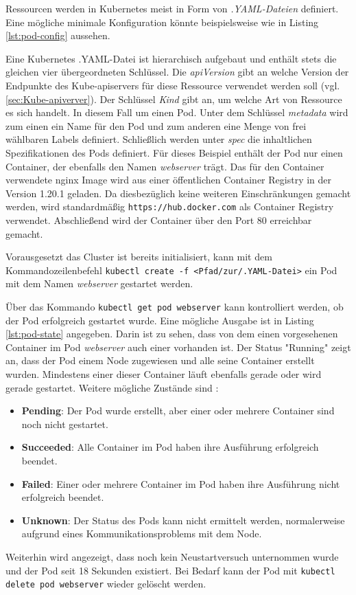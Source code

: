 \documentclass[11pt,a4paper]{article}
\begin{document}
Ressourcen werden in Kubernetes meist in Form von \emph{.YAML-Dateien} definiert.
Eine mögliche minimale Konfiguration könnte beispielsweise wie in Listing \ref{lst:pod-config} aussehen.



Eine Kubernetes .YAML-Datei ist hierarchisch aufgebaut
und enthält stets die gleichen vier übergeordneten Schlüssel.
Die \emph{apiVersion} gibt an welche Version der Endpunkte des Kube-apiservers für diese Ressource
verwendet werden soll (vgl. \ref{sec:Kube-apiverver}).
Der Schlüssel \emph{Kind} gibt an, um welche Art von Ressource es sich handelt.
In diesem Fall um einen Pod.
Unter dem Schlüssel \emph{metadata} wird zum einen ein Name für den Pod
und zum anderen eine Menge von frei wählbaren Labels definiert.
Schließlich werden unter \emph{spec} die inhaltlichen Spezifikationen des Pods
definiert. Für dieses Beispiel enthält der Pod nur einen Container, der ebenfalls den Namen
\emph{webserver} trägt. Das für den Container verwendete nginx Image \cite{nginx} wird aus einer
öffentlichen Container Registry in der Version 1.20.1 geladen. Da diesbezüglich keine weiteren
Einschränkungen gemacht werden, wird standardmäßig \linebreak \lstinline|https://hub.docker.com| als Container Registry
verwendet. Abschließend wird der Container über den Port 80 erreichbar gemacht. \cite{Schmeling_Dargatz_2022}

Vorausgesetzt das Cluster ist bereits initialisiert, kann mit dem Kommandozeilenbefehl
\lstinline|kubectl create -f <Pfad/zur/.YAML-Datei>|
ein Pod mit dem Namen \emph{webserver} gestartet werden.

Über das Kommando \lstinline|kubectl get pod webserver| kann kontrolliert werden,
ob der Pod erfolgreich gestartet wurde. Eine mögliche Ausgabe ist in
Listing \ref{lst:pod-state} angegeben. Darin ist zu sehen, dass
von dem einen vorgesehenen Container im Pod \emph{webserver} auch einer vorhanden ist.
Der Status "Running" zeigt an, dass der Pod einem Node zugewiesen und alle seine Container erstellt wurden.
Mindestens einer dieser Container läuft ebenfalls gerade oder wird gerade gestartet.
Weitere mögliche Zustände sind \cite{kubernetes.io_pod_lifecycle}:
\begin{itemize}
    \item \textbf{Pending}: Der Pod wurde erstellt, aber einer oder mehrere Container sind noch nicht gestartet.
    \item \textbf{Succeeded}: Alle Container im Pod haben ihre Ausführung erfolgreich beendet.
    \item \textbf{Failed}: Einer oder mehrere Container im Pod haben ihre Ausführung nicht erfolgreich beendet.
    \item \textbf{Unknown}: Der Status des Pods kann nicht ermittelt werden, normalerweise aufgrund eines Kommunikationsproblems mit dem Node.
\end{itemize}
Weiterhin wird angezeigt, dass noch kein Neustartversuch unternommen wurde
und der Pod seit 18 Sekunden existiert.
Bei Bedarf kann der Pod mit \lstinline|kubectl delete pod webserver| wieder gelöscht werden.
\end{document}

